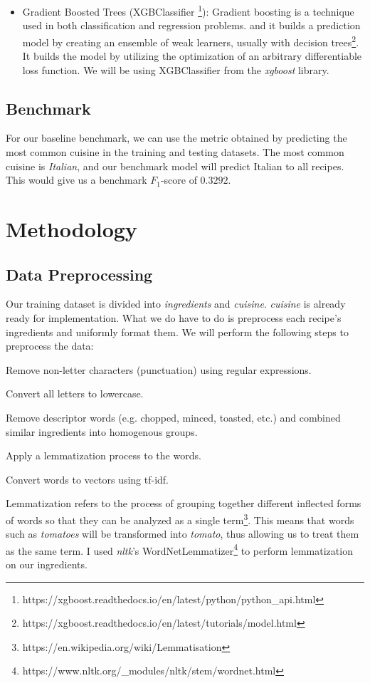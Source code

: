 \documentclass[12pt]{article}
\begin{document}
\begin{itemize}
	\item Gradient Boosted Trees (XGBClassifier \footnote{https://xgboost.readthedocs.io/en/latest/python/python\_api.html}): Gradient boosting is a technique used in both classification and regression problems. and it builds a prediction model by creating an ensemble of weak learners, usually with decision trees\footnote{https://xgboost.readthedocs.io/en/latest/tutorials/model.html}. It builds the model by utilizing the optimization of an arbitrary differentiable loss function. We will be using XGBClassifier from the \textit{xgboost} library.
\end{itemize}

\subsection{Benchmark}
For our baseline benchmark, we can use the metric obtained by predicting the most common cuisine in the training and testing datasets. The most common cuisine is \textit{Italian}, and our benchmark model will predict Italian to all recipes. This would give us a benchmark $F_1$-score of $0.3292$.

\section{Methodology}
\subsection{Data Preprocessing}
Our training dataset is divided into \textit{ingredients} and \textit{cuisine}. \textit{cuisine} is already ready for implementation. What we do have to do is preprocess each recipe's ingredients and uniformly format them. We will perform the following steps to preprocess the data:

\begin{legal}
	\item Remove non-letter characters (punctuation) using regular expressions.
	\item Convert all letters to lowercase.
	\item Remove descriptor words (e.g. chopped, minced, toasted, etc.) and combined similar ingredients into homogenous groups.
	\item Apply a lemmatization process to the words.	
	\item Convert words to vectors using tf-idf.
\end{legal}

\noindent
Lemmatization refers to the process of grouping together different inflected forms of words so that they can be analyzed as a single term\footnote{https://en.wikipedia.org/wiki/Lemmatisation}. This means that words such as \textit{tomatoes} will be transformed into \textit{tomato}, thus allowing us to treat them as the same term. I used \textit{nltk}'s WordNetLemmatizer\footnote{https://www.nltk.org/\_modules/nltk/stem/wordnet.html} to perform lemmatization on our ingredients.
\end{document}

